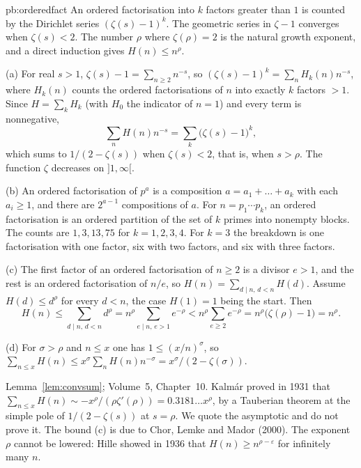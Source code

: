 \begin{solution}{pb:orderedfact}
\idea An ordered factorisation into $k$ factors greater than $1$ is counted by the Dirichlet series $(\zeta(s)-1)^k$. The geometric series in $\zeta-1$ converges when $\zeta(s)<2$. The number $\rho$ where $\zeta(\rho)=2$ is the natural growth exponent, and a direct induction gives $H(n)\le n^\rho$.

\writeup (a) For real $s>1$, $\zeta(s)-1=\sum_{n\ge2}n^{-s}$, so $(\zeta(s)-1)^k=\sum_n H_k(n)n^{-s}$, where $H_k(n)$ counts the ordered factorisations of $n$ into exactly $k$ factors $>1$. Since $H=\sum_k H_k$ (with $H_0$ the indicator of $n=1$) and every term is nonnegative,
\[
\sum_n H(n)n^{-s}=\sum_k\bigl(\zeta(s)-1\bigr)^k,
\]
which sums to $1/(2-\zeta(s))$ when $\zeta(s)<2$, that is, when $s>\rho$. The function $\zeta$ decreases on $]1,\infty[$.

(b) An ordered factorisation of $p^a$ is a composition $a=a_1+\dots+a_k$ with each $a_i\ge1$, and there are $2^{a-1}$ compositions of $a$. For $n=p_1\cdots p_k$, an ordered factorisation is an ordered partition of the set of $k$ primes into nonempty blocks. The counts are $1,3,13,75$ for $k=1,2,3,4$. For $k=3$ the breakdown is one factorisation with one factor, six with two factors, and six with three factors.

(c) The first factor of an ordered factorisation of $n\ge2$ is a divisor $e>1$, and the rest is an ordered factorisation of $n/e$, so $H(n)=\sum_{d\mid n,\,d<n}H(d)$. Assume $H(d)\le d^\rho$ for every $d<n$, the case $H(1)=1$ being the start. Then
\[
H(n)\le\sum_{d\mid n,\,d<n}d^\rho=n^\rho\sum_{e\mid n,\,e>1}e^{-\rho}<n^\rho\sum_{e\ge2}e^{-\rho}=n^\rho\bigl(\zeta(\rho)-1\bigr)=n^\rho.
\]

(d) For $\sigma>\rho$ and $n\le x$ one has $1\le(x/n)^\sigma$, so $\sum_{n\le x}H(n)\le x^\sigma\sum_n H(n)n^{-\sigma}=x^\sigma/(2-\zeta(\sigma))$.

\tools Lemma~\ref{lem:convsum}; Volume~5, Chapter~10.
\leads Kalm\'ar proved in 1931 that $\sum_{n\le x}H(n)\sim -x^\rho/(\rho\zeta'(\rho))=0.3181\ldots x^\rho$, by a Tauberian theorem at the simple pole of $1/(2-\zeta(s))$ at $s=\rho$. We quote the asymptotic and do not prove it. The bound (c) is due to Chor, Lemke and Mador (2000). The exponent $\rho$ cannot be lowered: Hille showed in 1936 that $H(n)\ge n^{\rho-\varepsilon}$ for infinitely many $n$.
\end{solution}


